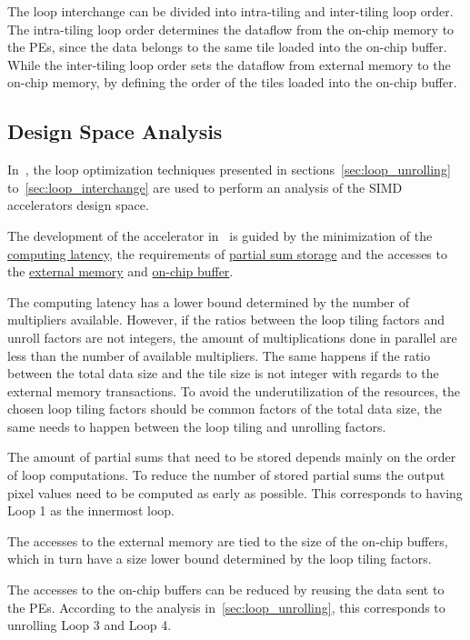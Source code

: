 The loop interchange can be divided into intra-tiling and inter-tiling loop
order. The intra-tiling loop order determines the dataflow from the on-chip
memory to the PEs, since the data belongs to the same tile loaded into the
on-chip buffer. While the inter-tiling loop order sets the dataflow from
external memory to the on-chip memory, by defining the order of the tiles loaded
into the on-chip buffer.

\subsection{Design Space Analysis}
\label{sec:datapath_opt_analysis}
In~\cite{Ma:80_OptDataflow_in_CNN}, the loop optimization techniques presented in sections~\ref{sec:loop_unrolling} to~\ref{sec:loop_interchange} are used to perform an analysis of the SIMD accelerators design space.


The development of the accelerator in~\cite{Ma:80_OptDataflow_in_CNN} is guided by the minimization of the
\underline{computing latency}, the requirements of \underline{partial sum
  storage} and the accesses to the \underline{external memory} and
\underline{on-chip buffer}.

The computing latency has a lower bound determined by the number of multipliers
available. However, if the ratios between the loop tiling factors and unroll
factors are not integers, the amount of multiplications done in parallel are less than the number of available multipliers. 
The same
happens if the ratio between the total data size and the tile size is not
integer with regards to the external memory transactions. 
To avoid the
underutilization of the resources, the chosen loop tiling factors should be
common factors of the total data size, the same needs to happen between the loop
tiling and unrolling factors.

The amount of partial sums that need to be stored depends mainly on the order of
loop computations. To reduce the number of stored partial sums the output pixel
values need to be computed as early as possible. This corresponds to having Loop
1 as the innermost loop.

The accesses to the external memory are tied to the size of the on-chip buffers,
which in turn have a size lower bound determined by the loop tiling factors.

The accesses to the on-chip buffers can be reduced by reusing the data sent to
the PEs. According to the analysis in~\ref{sec:loop_unrolling}, this corresponds
to unrolling Loop 3 and Loop 4.

